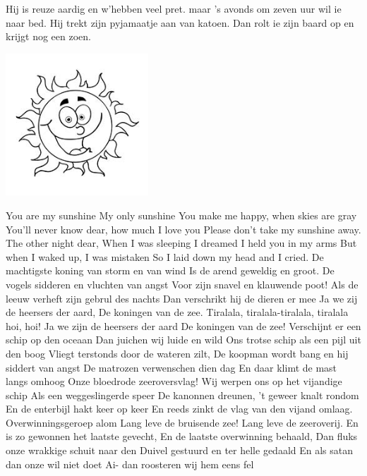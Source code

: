 \documentclass{article}
\begin{document}
\begin{songs}{}
\beginverse*
Hij is reuze aardig en w’hebben veel pret.
maar 's avonds om zeven uur wil ie naar bed.
Hij trekt zijn pyjamaatje aan van katoen.
Dan rolt ie zijn baard op en krijgt nog een zoen.
\endverse
\endsong
\begin{intersong}
    \includegraphics[width=0.4\textwidth]{youaremysunshine}
\end{intersong}
\beginverse*
You are my sunshine
My only sunshine
You make me happy, when skies are gray
You’ll never know dear, how much I love you
Please don’t take my sunshine away.
\endverse
\beginverse*
The other night dear,
When I was sleeping
I dreamed I held you in my arms
But when I waked up, I was mistaken
So I laid down my head and I cried.
\endverse
\endsong
{}
\beginverse*
De machtigste koning van storm en van wind 
Is de arend geweldig en groot. 
De vogels sidderen en vluchten van angst 
Voor zijn snavel en klauwende poot! 
Als de leeuw verheft zijn gebrul des nachts 
Dan verschrikt hij de dieren er mee 
Ja we zij de heersers der aard,
De koningen van de zee.
\endverse
\beginchorus
Tiralala, tiralala-tiralala, tiralala hoi, hoi! 
Ja we zijn de heersers der aard 
De koningen van de zee! 
\endchorus
\beginverse*
Verschijnt er een schip op den oceaan 
Dan juichen wij luide en wild 
Ons trotse schip als een pijl uit den boog 
Vliegt terstonds door de wateren zilt, 
De koopman wordt bang en hij siddert van angst 
De matrozen verwenschen dien dag 
En daar klimt de mast langs omhoog 
Onze bloedrode zeeroversvlag!
\endverse
\beginverse*
Wij werpen ons op het vijandige schip 
Als een weggeslingerde speer 
De kanonnen dreunen, ’t geweer knalt rondom
En de enterbijl hakt keer op keer
En reeds zinkt de vlag van den vijand omlaag. Overwinningsgeroep alom Lang leve de bruisende zee! Lang leve de zeeroverij. 
\endverse
\beginverse*
En is zo gewonnen het laatste gevecht, 
En de laatste overwinning behaald, 
Dan fluks onze wrakkige schuit naar den 
Duivel gestuurd en ter helle gedaald 
En als satan dan onze wil niet doet Ai- dan roosteren wij hem eens fel 

\end{songs}
\end{document}
